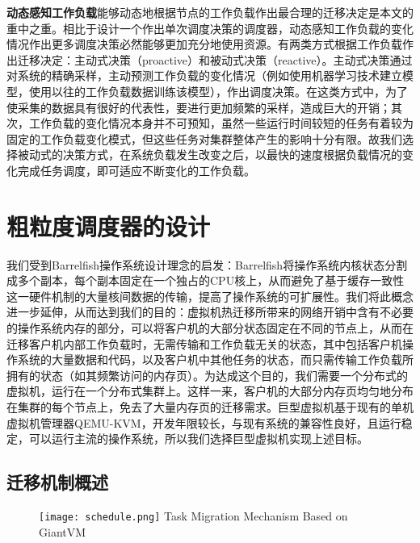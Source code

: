 \noindent\textbf{动态感知工作负载}\quad 能够动态地根据节点的工作负载作出最合理的迁移决定是本文的重中之重。相比于设计一个作出单次调度决策的调度器，动态感知工作负载的变化情况作出更多调度决策必然能够更加充分地使用资源。有两类方式根据工作负载作出迁移决定：主动式决策（proactive）和被动式决策（reactive）。主动式决策通过对系统的精确采样，主动预测工作负载的变化情况（例如使用机器学习技术建立模型，使用以往的工作负载数据训练该模型），作出调度决策。在这类方式中，为了使采集的数据具有很好的代表性，要进行更加频繁的采样，造成巨大的开销；其次，工作负载的变化情况本身并不可预知，虽然一些运行时间较短的任务有着较为固定的工作负载变化模式，但这些任务对集群整体产生的影响十分有限。故我们选择被动式的决策方式，在系统负载发生改变之后，以最快的速度根据负载情况的变化完成任务调度，即可适应不断变化的工作负载。

\section{粗粒度调度器的设计}
我们受到Barrelfish操作系统设计理念的启发：Barrelfish将操作系统内核状态分割成多个副本，每个副本固定在一个独占的CPU核上，从而避免了基于缓存一致性这一硬件机制的大量核间数据的传输，提高了操作系统的可扩展性。我们将此概念进一步延伸，从而达到我们的目的：虚拟机热迁移所带来的网络开销中含有不必要的操作系统内存的部分，可以将客户机的大部分状态固定在不同的节点上，从而在迁移客户机内部工作负载时，无需传输和工作负载无关的状态，其中包括客户机操作系统的大量数据和代码，以及客户机中其他任务的状态，而只需传输工作负载所拥有的状态（如其频繁访问的内存页）。为达成这个目的，我们需要一个分布式的虚拟机，运行在一个分布式集群上。这样一来，客户机的大部分内存页均匀地分布在集群的每个节点上，免去了大量内存页的迁移需求。巨型虚拟机基于现有的单机虚拟机管理器QEMU-KVM，开发年限较长，与现有系统的兼容性良好，且运行稳定，可以运行主流的操作系统，所以我们选择巨型虚拟机实现上述目标。

\subsection{迁移机制概述}
\begin{figure}[!htp]
  \centering
  \texttt{[image: schedule.png]}
    {Task Migration Mechanism Based on GiantVM}
  \label{fig:schedule}
\end{figure}

